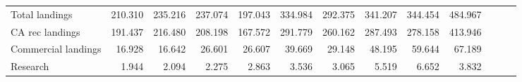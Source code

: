 \documentclass[
  english,
  a4paper,
]{article}
\begin{document}
\begin{table}[H]
{\begin{tabular}[t]{lrrrrrrrrrrrr}
\hspace{1em}Total landings & 210.310 & 235.216 & 237.074 & 197.043 & 334.984 & 292.375 & 341.207 & 344.454 & 484.967 &  &  & \\
\hspace{1em}CA rec landings & 191.437 & 216.480 & 208.198 & 167.572 & 291.779 & 260.162 & 287.493 & 278.158 & 413.946 &  &  & \\
\hspace{1em}Commercial landings & 16.928 & 16.642 & 26.601 & 26.607 & 39.669 & 29.148 & 48.195 & 59.644 & 67.189 &  &  & \\
\hspace{1em}Research & 1.944 & 2.094 & 2.275 & 2.863 & 3.536 & 3.065 & 5.519 & 6.652 & 3.832 &  &  & \\
\bottomrule
\end{tabular}}
\end{table}
\end{document}
